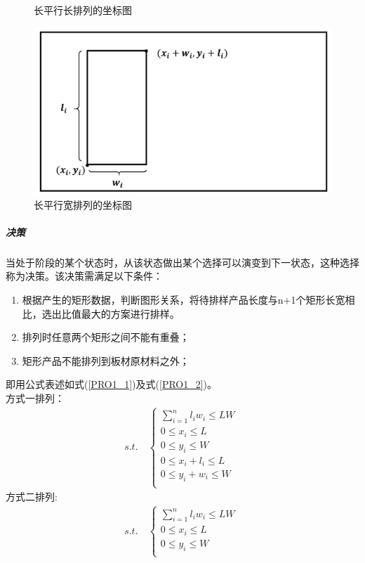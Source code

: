 \documentclass[hyperref,UTF8]{article}
\begin{document}
{\begin{figure}[htbp]
  \caption{长平行长排列的坐标图}\label{py-long}
\end{figure}
\begin{figure}[htbp]
  \centering
  \includegraphics[width=.7\textwidth]{picture/PPT2}
  \caption{长平行宽排列的坐标图}\label{py-long2}
\end{figure}
\subparagraph{决策}当处于阶段的某个状态时，从该状态做出某个选择可以演变到下一状态，这种选择称为决策。该决策需满足以下条件：
\begin{enumerate}
  \item 根据产生的矩形数据，判断图形关系，将待排样产品长度与n+1个矩形长宽相比，选出比值最大的方案进行排样。
  \item 排列时任意两个矩形之间不能有重叠；
  \item 矩形产品不能排列到板材原材料之外；
\end{enumerate}
即用公式表述如式(\ref{PRO1_1})及式(\ref{PRO1_2})。\\
方式一排列：
\begin{equation}\label{PRO1_1}
\begin{split}
&s.t.\quad  \left\{\begin{array}{c}
\sum_{i=1}^n l_iw_i\leq LW\quad\\
0\leq x_i\leq L\quad \\
0\leq y_i\leq W\quad \\
0\leq x_i+l_i\leq L\quad \\
0\leq y_i+w_i\leq W\quad \\
\end{array}\right.
\end{split}
\end{equation}
方式二排列:
\begin{equation}\label{PRO1_2}
\begin{split}
&s.t.\quad  \left\{\begin{array}{c}
\sum_{i=1}^n l_iw_i\leq LW\quad\\
0\leq x_i\leq L\quad \\
0\leq y_i\leq W\quad \\

\end{array}
\end{split}
\end{equation}}
\end{document}
